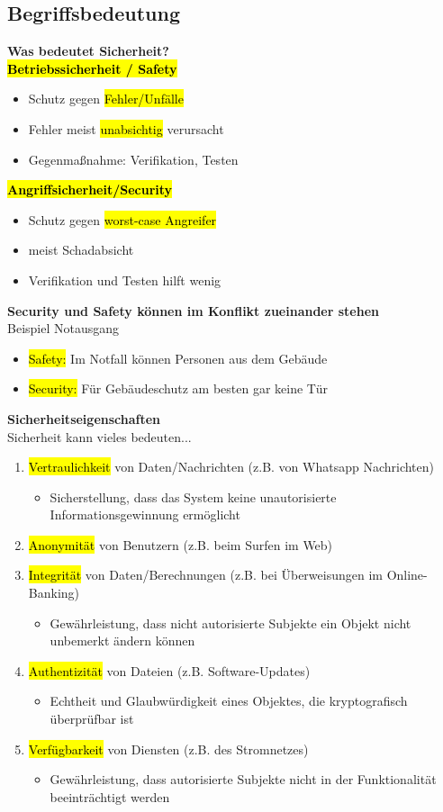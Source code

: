 \documentclass[a4paper, 10pt]{article}
\begin{document}
\subsection{Begriffsbedeutung}
\textbf{Was bedeutet Sicherheit?}\\[3mm]
\textbf{\hl{Betriebssicherheit / Safety}} 
\begin{itemize}
    \item Schutz gegen \hl{Fehler/Unfälle}
    \item Fehler meist \hl{unabsichtig} verursacht
    \item Gegenmaßnahme: Verifikation, Testen 
\end{itemize}
\textbf{\hl{Angriffsicherheit/Security}}
\begin{itemize}
    \item Schutz gegen \hl{worst-case Angreifer}
    \item meist Schadabsicht
    \item Verifikation und Testen hilft wenig
\end{itemize}
\textbf{Security und Safety können im Konflikt zueinander stehen}\\
Beispiel Notausgang 
\begin{itemize}
    \item \hl{Safety:} Im Notfall können Personen aus dem Gebäude 
    \item \hl{Security:} Für Gebäudeschutz am besten gar keine Tür
\end{itemize}
\textbf{Sicherheitseigenschaften}\\
Sicherheit kann vieles bedeuten...
\begin{enumerate}
    \item \hl{Vertraulichkeit} von Daten/Nachrichten (z.B. von Whatsapp Nachrichten)
    \begin{itemize}
        \item Sicherstellung, dass das System keine unautorisierte Informationsgewinnung ermöglicht
    \end{itemize}
    \item \hl{Anonymität} von Benutzern (z.B. beim Surfen im Web)
    \item \hl{Integrität} von Daten/Berechnungen (z.B. bei Überweisungen im Online-Banking)
    \begin{itemize}
        \item Gewährleistung, dass nicht autorisierte Subjekte ein Objekt nicht unbemerkt ändern können
    \end{itemize}
    \item \hl{Authentizität} von Dateien (z.B. Software-Updates)
    \begin{itemize}
        \item Echtheit und Glaubwürdigkeit eines Objektes, die kryptografisch überprüfbar ist 
    \end{itemize}
    \item \hl{Verfügbarkeit} von Diensten (z.B. des Stromnetzes)
    \begin{itemize}
        \item Gewährleistung, dass autorisierte Subjekte nicht in der Funktionalität beeinträchtigt werden
    \end{itemize}
\end{enumerate}
\end{document}
